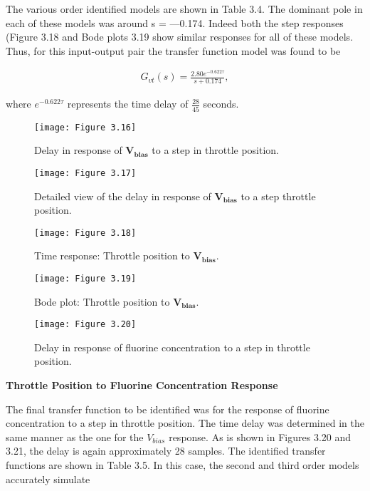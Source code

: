 The various order identified models are shown in Table 3.4. The dominant pole in each of these models was around s = —0.174. Indeed both the step responses (Figure 3.18 and Bode plots 3.19 show similar responses for all of these models. Thus, for this input-output pair the transfer function model was found to be

\begin{align}
	G_{vt}(s)=\frac{2.80e^{-0.622\tau}}{s+0.174},
\end{align}

\noindent where $e^{-0.622\tau}$ represents the time delay of $\frac{28}{45}$ seconds.

\begin{figure}[H]
	\centering
	\texttt{[image: Figure 3.16]}
	\bf\caption{  Delay in response of $\mathbf{V_{bias}}$ to a step in throttle position.}
	\label{fig:3.16}
\end{figure}

\begin{figure}[H]
	\centering
	\texttt{[image: Figure 3.17]}
	\bf\caption{  Detailed view of the delay in response of $\mathbf{V_{bias}}$ to a step throttle position.}
	\label{fig:3.17}
\end{figure}

\begin{figure}[H]
	\centering
	\texttt{[image: Figure 3.18]}
	\bf\caption{  Time response: Throttle position to $\mathbf{V_{bias}}$.}
	\label{fig:3.18}
\end{figure}

\begin{figure}[H]
	\centering
	\texttt{[image: Figure 3.19]}
	\bf\caption{  Bode plot: Throttle position to $\mathbf{V_{bias}}$.}
	\label{fig:3.19}
\end{figure}

\begin{figure}[H]
	\centering
	\texttt{[image: Figure 3.20]}
	\bf\caption{  Delay in response of fluorine concentration to a step in throttle position. }
	\label{fig:3.20}
\end{figure}

\noindent \textbf{Throttle Position to Fluorine Concentration Response}

The final transfer function to be identified was for the response of fluorine concentration to a step in throttle position. The time delay was determined in the same manner as the one for the $V_{bias}$ response. As is shown in Figures 3.20 and 3.21, the delay is again approximately 28 samples. The identified transfer functions are shown in Table 3.5. In this case, the second and third order models accurately simulate 

